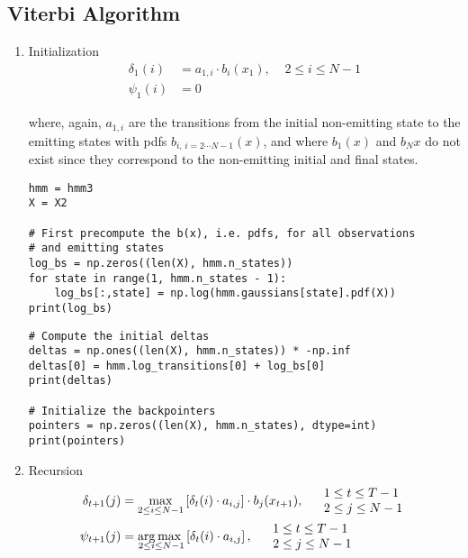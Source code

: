 \documentclass[11pt]{article}
\begin{document}
\subsection{Viterbi Algorithm}
\label{sec:orgd509c89}
\begin{enumerate}
\item Initialization
\label{sec:org2bca4e0}
\begin{align*}
    \delta_1(i) &= a_{1,i} \cdot b_i(x_1), \;\;\;\; 2 \leq i \leq N-1 \\
    \psi_1(i) &= 0
\end{align*}

where, again, \(a_{1,i}\) are the transitions from the initial non-emitting
state to the emitting states with pdfs \(b_{i,\,i = 2 \cdots N-1}(x)\),
and where \(b_1(x)\) and \(b_N{x}\) do not exist since they correspond to
the non-emitting initial and final states.

\begin{verbatim}
hmm = hmm3
X = X2

# First precompute the b(x), i.e. pdfs, for all observations
# and emitting states
log_bs = np.zeros((len(X), hmm.n_states))
for state in range(1, hmm.n_states - 1):
    log_bs[:,state] = np.log(hmm.gaussians[state].pdf(X))
print(log_bs)
\end{verbatim}

\begin{verbatim}
# Compute the initial deltas
deltas = np.ones((len(X), hmm.n_states)) * -np.inf
deltas[0] = hmm.log_transitions[0] + log_bs[0]
print(deltas)

# Initialize the backpointers
pointers = np.zeros((len(X), hmm.n_states), dtype=int)
print(pointers)
\end{verbatim}

\item Recursion
\label{sec:org45f42d3}
\begin{align*}
        \delta_{t+1}(j) &= \max_{2 \leq i \leq N-1}
            \left[ \delta_{t}(i) \cdot a_{i,j} \right]
            \cdot b_j(x_{t+1}),
        \;\;\;\; \begin{array}{l} 1 \leq t \leq T-1 \\ 2 \leq j \leq N-1 \end{array}
        \\
        \psi_{t+1}(j) &= \mbox{arg}\hspace{-0.5ex}\max_{\hspace{-3ex}2 \leq i \leq N-1}
        \left[ \delta_{t}(i) \cdot a_{i,j} \right],
        \;\;\;\; \begin{array}{l} 1 \leq t \leq T-1 \\ 2 \leq j \leq N-1 \end{array}
\end{align*}


\end{enumerate}
\end{document}
